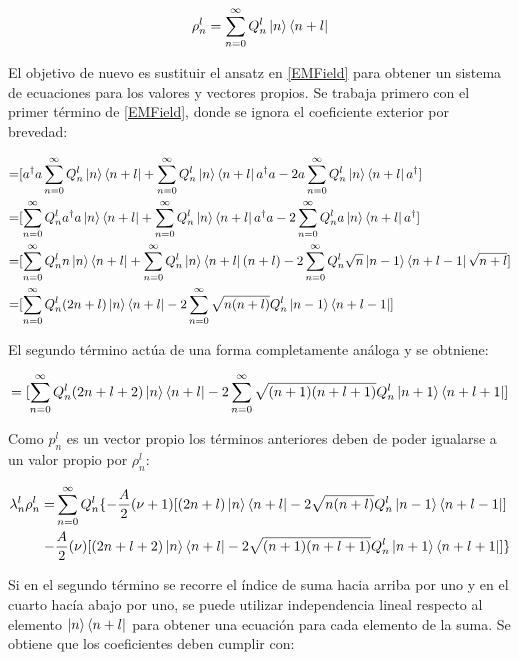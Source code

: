 \documentclass[a4paper,10pt]{report}
\begin{document}
\begin{equation}
 \rho^l_n = \sum_{n=0}^\infty Q_n^l\Ket{n}\Bra{n+l}
\end{equation} 

El objetivo de nuevo es sustituir el ansatz en \eqref{EMField} para obtener un sistema de ecuaciones para los valores y vectores propios. Se trabaja primero con el primer término de \eqref{EMField}, donde se ignora el coeficiente exterior por brevedad:

\begin{align*}
=&[a^\dagger a\sum_{n=0}^\infty Q_n^l\Ket{n}\Bra{n+l} + \sum_{n=0}^\infty Q_n^l\Ket{n}\Bra{n+l} a^\dagger a -2a\sum_{n=0}^\infty Q_n^l\Ket{n}\Bra{n+l} a^\dagger]\\
=&[\sum_{n=0}^\infty Q_n^la^\dagger a\Ket{n}\Bra{n+l} + \sum_{n=0}^\infty Q_n^l\Ket{n}\Bra{n+l} a^\dagger a -2\sum_{n=0}^\infty Q_n^la\Ket{n}\Bra{n+l} a^\dagger]\\
=&[\sum_{n=0}^\infty Q_n^ln\Ket{n}\Bra{n+l} + \sum_{n=0}^\infty Q_n^l\Ket{n}\Bra{n+l} (n+l) -2\sum_{n=0}^\infty Q_n^l\sqrt{n}\Ket{n-1}\Bra{n+l-1}\sqrt{n+l}]\\
=&[\sum_{n=0}^\infty Q_n^l(2n+l)\Ket{n}\Bra{n+l} -2\sum_{n=0}^\infty\sqrt{n(n+l)} Q_n^l\Ket{n-1}\Bra{n+l-1}]\\
\end{align*}

El segundo término actúa de una forma completamente análoga y se obtniene:

\begin{equation*}
=[\sum_{n=0}^\infty Q_n^l(2n+l+2)\Ket{n}\Bra{n+l} -2\sum_{n=0}^\infty\sqrt{(n+1)(n+l+1)} Q_n^l\Ket{n+1}\Bra{n+l+1}]
\end{equation*}

Como $p^l_n$  es un vector propio los términos anteriores deben de poder igualarse a un valor propio por $\rho^l_n$:

\begin{align}
\lambda_n^l \rho_n^l=& \sum_{n=0}^\infty Q_n^l \{ -\frac{A}{2}(\nu+1)[(2n+l)\Ket{n}\Bra{n+l} -2\sqrt{n(n+l)} Q_n^l\Ket{n-1}\Bra{n+l-1}] \nonumber \\
-&\frac{A}{2}(\nu)[(2n+l+2)\Ket{n}\Bra{n+l}-2\sqrt{(n+1)(n+l+1)} Q_n^l\Ket{n+1}\Bra{n+l+1}]\}
\end{align}

Si en el segundo término se recorre el índice de suma hacia arriba por uno y en el cuarto hacía abajo por uno, se puede utilizar independencia lineal respecto al elemento $\Ket{n}\Bra{n+l}$ para obtener una ecuación para cada elemento de la suma. Se obtiene que los coeficientes deben cumplir con:
\end{document}
